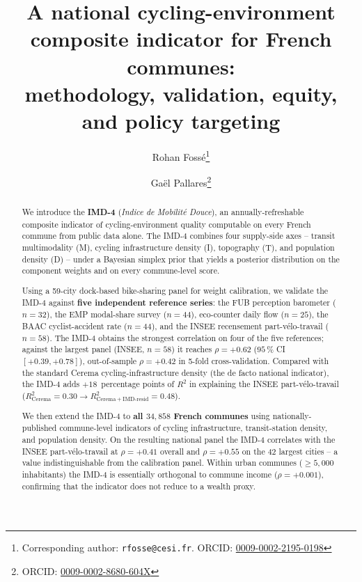 \documentclass[11pt,a4paper]{article}
\title{\Large\bfseries A national cycling-environment composite indicator
for French communes:\\
\large methodology, validation, equity, and policy targeting}
\author[1]{Rohan Foss\'e\thanks{Corresponding author: \texttt{rfosse@cesi.fr}. ORCID: \href{https://orcid.org/0009-0002-2195-0198}{0009-0002-2195-0198}}}
\author[2]{Ga\"el Pallares\thanks{ORCID: \href{https://orcid.org/0009-0002-8680-604X}{0009-0002-8680-604X}}}
\affil[1]{CESI Engineering School, Montpellier, France}
\affil[2]{CESI LINEACT (EA 7527), Montpellier, France}
\date{}
\newcommand{\IMD}{\mathrm{IMD}}
\begin{document}
\maketitle

\begin{abstract}
\noindent
We introduce the \textbf{IMD-4} (\emph{Indice de Mobilit\'e Douce}),
an annually-refreshable composite indicator of cycling-environment
quality computable on every French commune from public data alone.  The IMD-4 combines
four supply-side axes -- transit multimodality (M), cycling infrastructure
density (I), topography (T), and population density (D) -- under a
Bayesian simplex prior that yields a posterior distribution on the
component weights and on every commune-level score.

Using a 59-city dock-based bike-sharing panel for weight calibration,
we validate the IMD-4 against \textbf{five independent reference series}:
the FUB perception barometer ($n=32$), the EMP modal-share survey
($n=44$), eco-counter daily flow ($n=25$), the BAAC cyclist-accident
rate ($n=44$), and the INSEE recensement part-v\'elo-travail ($n=58$).
The IMD-4 obtains the strongest correlation on four of the five
references; against the largest panel (INSEE, $n=58$) it reaches
$\rho = +0.62$ ($95\,\%$ CI $[+0.39, +0.78]$), out-of-sample
$\rho = +0.42$ in 5-fold cross-validation.  Compared with the standard
Cerema cycling-infrastructure density (the de facto national
indicator), the IMD-4 adds $+18\,$ percentage points of $R^2$ in
explaining the INSEE part-v\'elo-travail
($R^2_{\text{Cerema}} = 0.30 \to R^2_{\text{Cerema} + \IMD\text{-resid}} = 0.48$).

We then extend the IMD-4 to \textbf{all $34{,}858$ French communes}
using nationally-published commune-level indicators of cycling
infrastructure, transit-station density, and population density.
On the resulting national panel the IMD-4 correlates with the
INSEE part-v\'elo-travail at $\rho = +0.41$ overall and $\rho = +0.55$
on the 42 largest cities -- a value indistinguishable from the
calibration panel.  Within urban communes ($\geq 5{,}000$
inhabitants) the IMD-4 is essentially orthogonal to commune income
($\rho = +0.001$), confirming that the indicator does not reduce to a
wealth proxy.


\end{abstract}
\end{document}
